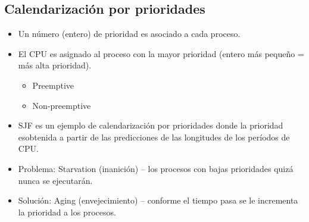 \documentclass[a4paper, 11pt]{article}
\begin{document}
\subsection{Calendarización por prioridades}
\begin{itemize}
    \item Un número (entero) de prioridad es asociado a cada proceso.
    \item El CPU es asignado al proceso con la mayor prioridad (entero más pequeño = más alta prioridad).
    \begin{itemize}
        \item Preemptive
        \item Non-preemptive
    \end{itemize}
    \item SJF es un ejemplo de calendarización por prioridades donde la prioridad esobtenida a partir de las predicciones de las longitudes de los períodos de CPU.
    \item Problema: Starvation (inanición) -- los procesos con bajas prioridades quizá nunca se ejecutarán.
    \item Solución: Aging (envejecimiento) -- conforme el tiempo pasa se le incrementa la prioridad a los procesos.
\end{itemize}
\end{document}
